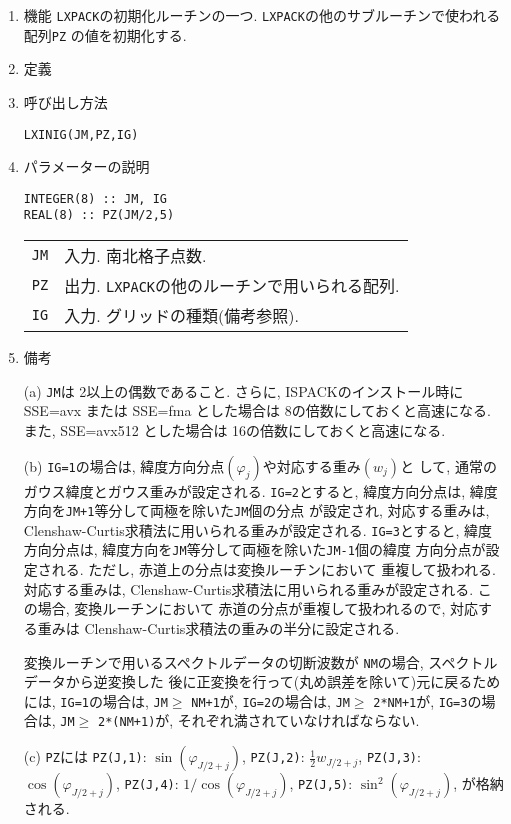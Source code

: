 \documentclass[a4j]{jarticle}
\begin{document}
\begin{enumerate}

\item 機能
\texttt{LXPACK}の初期化ルーチンの一つ.
\texttt{LXPACK}の他のサブルーチンで使われる配列\texttt{PZ}
の値を初期化する.

\item 定義

\item 呼び出し方法 
    
\texttt{LXINIG(JM,PZ,IG)}
  
\item パラメーターの説明

\begin{verbatim}
INTEGER(8) :: JM, IG
REAL(8) :: PZ(JM/2,5)
\end{verbatim}
      
\begin{tabular}{ll}
\texttt{JM} & 入力. 南北格子点数.\\
\texttt{PZ}  & 出力. \texttt{LXPACK}の他のルーチンで用いられる配列.\\
\texttt{IG} & 入力. グリッドの種類(備考参照).
\end{tabular}

\item 備考

(a) 
\texttt{JM}は 2以上の偶数であること. さらに, ISPACKのインストール時に
SSE=avx または SSE=fma とした場合は 8の倍数にしておくと高速になる.
また, SSE=avx512 とした場合は 16の倍数にしておくと高速になる.

(b) \texttt{IG=1}の場合は, 緯度方向分点$(\varphi_j)$や対応する重み$(w_j)$と
して, 通常のガウス緯度とガウス重みが設定される.
\texttt{IG=2}とすると, 緯度方向分点は, 
緯度方向を\texttt{JM+1}等分して両極を除いた\texttt{JM}個の分点
が設定され, 対応する重みは, Clenshaw-Curtis求積法に用いられる重みが設定される.
\texttt{IG=3}とすると, 緯度方向分点は, 
緯度方向を\texttt{JM}等分して両極を除いた\texttt{JM-1}個の緯度
方向分点が設定される. ただし, 赤道上の分点は変換ルーチンにおいて
重複して扱われる.
対応する重みは, Clenshaw-Curtis求積法に用いられる重みが設定される.
この場合, 変換ルーチンにおいて
赤道の分点が重複して扱われるので, 対応する重みは
Clenshaw-Curtis求積法の重みの半分に設定される.

変換ルーチンで用いるスペクトルデータの切断波数が
\texttt{NM}の場合, スペクトルデータから逆変換した
後に正変換を行って(丸め誤差を除いて)元に戻るためには,
\texttt{IG=1}の場合は, \texttt{JM}$\ge$ \texttt{NM+1}が,
\texttt{IG=2}の場合は, \texttt{JM}$\ge$ \texttt{2*NM+1}が,
\texttt{IG=3}の場合は, \texttt{JM}$\ge$ \texttt{2*(NM+1)}が,
それぞれ満されていなければならない.

(c) \texttt{PZ}には
   \texttt{PZ(J,1)}:  $\sin(\varphi_{J/2+j})$,
   \texttt{PZ(J,2)}:  $\frac12 w_{J/2+j}$, 
   \texttt{PZ(J,3)}:  $\cos(\varphi_{J/2+j})$,
   \texttt{PZ(J,4)}:  $1/\cos(\varphi_{J/2+j})$,
   \texttt{PZ(J,5)}:  $\sin^2(\varphi_{J/2+j})$,
が格納される.

\end{enumerate}
\end{document}
